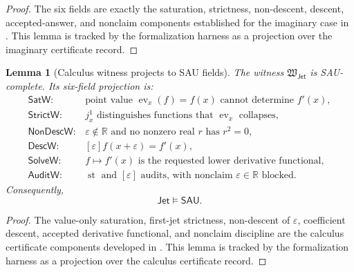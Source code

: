 \documentclass[11pt]{article}
\newcommand{\SAU}{\mathsf{SAU}}
\newcommand{\Jet}{\mathsf{Jet}}
\newtheorem{lemma}[theorem]{Lemma}
\theoremstyle{definition}
\begin{document}
\begin{proof}
The six fields are exactly the saturation, strictness, non-descent, descent,
accepted-answer, and nonclaim components established for the imaginary case in
.  This lemma is tracked by the formalization harness as a
projection over the imaginary certificate record.
\end{proof}

\begin{lemma}[Calculus witness projects to SAU fields]
\label{lem:sau-cross-jet-fields}
The witness \(\mathfrak W_{\Jet}\) is SAU-complete.  Its six-field projection is:
\[
\begin{array}{ll}
\mathsf{SatW}:& \text{point value }\operatorname{ev}_x(f)=f(x)\text{ cannot determine }f'(x),\\[1mm]
\mathsf{StrictW}:& j_x^1\text{ distinguishes functions that }\operatorname{ev}_x\text{ collapses},\\[1mm]
\mathsf{NonDescW}:& \varepsilon\notin\mathbb R\text{ and no nonzero real }r\text{ has }r^2=0,\\[1mm]
\mathsf{DescW}:& [\varepsilon]f(x+\varepsilon)=f'(x),\\[1mm]
\mathsf{SolveW}:& f\mapsto f'(x)\text{ is the requested lower derivative functional},\\[1mm]
\mathsf{AuditW}:& \operatorname{st}\text{ and }[\varepsilon]\text{ audits, with nonclaim }\varepsilon\in\mathbb R\text{ blocked}.
\end{array}
\]
Consequently,
\[
\Jet\models\SAU.
\]
\end{lemma}

\begin{proof}
The value-only saturation, first-jet strictness, non-descent of
\(\varepsilon\), coefficient descent, accepted derivative functional, and
nonclaim discipline are the calculus certificate components developed in
.  This lemma is tracked by the formalization harness as a
projection over the calculus certificate record.
\end{proof}
\end{document}
